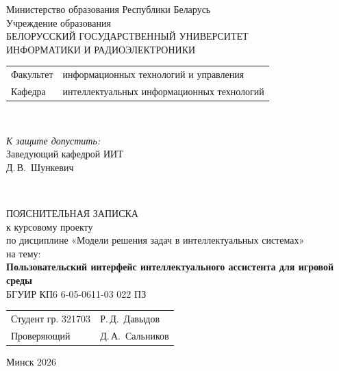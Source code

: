 \begin{titlepage}
  \begin{center}
    Министерство образования Республики Беларусь\\[1em]
    Учреждение образования\\
    БЕЛОРУССКИЙ ГОСУДАРСТВЕННЫЙ УНИВЕРСИТЕТ \\
    ИНФОРМАТИКИ И РАДИОЭЛЕКТРОНИКИ\\[1em]

    \begin{minipage}{\textwidth}
      \begin{flushleft}
        \begin{tabular}{ l l }
          Факультет & информационных технологий и управления\\
          Кафедра   & интеллектуальных информационных технологий
        \end{tabular}
      \end{flushleft}
    \end{minipage}\\[1em]

    \begin{flushright}
      \begin{minipage}{0.4\textwidth}
        \textit{К защите допустить:}\\[0.8em]
        Заведующий кафедрой ИИТ\\[0.45em]
        \underline{\hspace*{2.8cm}} Д.\,В.~Шункевич
      \end{minipage}\\[2.2em]
    \end{flushright}

    {ПОЯСНИТЕЛЬНАЯ ЗАПИСКА}\\
    {к курсовому проекту}\\
    {по дисциплине «Модели решения задач в интеллектуальных системах»}\\
    {на тему:}\\[1em]
    \textbf{\large Пользовательский интерфейс интеллектуального ассистента для
игровой среды}\\[1em]


    {БГУИР КП6 6‑05-0611-03 022 ПЗ}\\[2em]
    \vspace{2em}
    \begin{tabular}{ p{}p{} }
      Студент гр. 321703 & Р.\,Д.~Давыдов \\
      Проверяющий & Д.\,А.~Сальников \\
    \end{tabular}
    
    \vfill
    {\normalsize Минск 2026}
  \end{center}
\end{titlepage}
